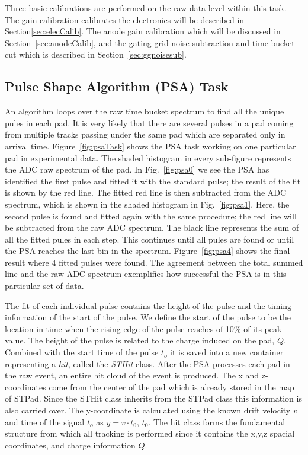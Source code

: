 Three basic calibrations are performed on the raw data level within this task. The gain calibration calibrates the electronics will be described in Section\ref{sec:elecCalib}. The anode gain calibration which will be discussed in Section~\ref{sec:anodeCalib}, and the gating grid noise subtraction and time bucket cut which is described in Section~\ref{sec:ggnoisesub}.


\subsection{Pulse Shape Algorithm (PSA) Task}
\label{sec:psa}
An algorithm loops over the raw time bucket spectrum to find all the unique pules in each pad. It is very likely that there are several pulses in a pad coming from multiple tracks passing under the same pad which are separated only in arrival time. Figure~\ref{fig:psaTask} shows the PSA task working on one particular pad in experimental data. The shaded histogram in every sub-figure represents the ADC raw spectrum of the pad. In Fig.~\ref{fig:psa0} we see the PSA has identified the first pulse and fitted it with the standard pulse; the result of the fit is shown by the red line. The fitted red line is then subtracted from the ADC spectrum, which is shown in the shaded histogram in Fig.~\ref{fig:psa1}. Here, the second pulse is found and fitted again with the same procedure; the red line will be subtracted from the raw ADC spectrum. The black line represents the sum of all the fitted pules in each step. This continues until all pules are found or until the PSA reaches the last bin in the spectrum. Figure~\ref{fig:psa4} shows the final result where 4 fitted pulses were found. The agreement between the total summed line and the raw ADC spectrum exemplifies how successful the PSA is in this particular set of data. 


The fit of each individual pulse contains the height of the pulse and the timing information of the start of the pulse. We define the start of the pulse to be the location in time when the rising edge of the pulse reaches of 10\% of its peak value. The height of the pulse is related to the charge induced on the pad, $Q$. Combined with the start time of the pulse $t_o$  it is saved into a new container representing a \emph{hit}, called the \emph{STHit} class. After the PSA processes each pad in the raw event, an entire hit cloud of the event is produced. The x and z-coordinates come from the center of the pad which is already stored in the map of STPad. Since the STHit class inherits from the STPad class this information is also carried over. The y-coordinate is calculated using the known drift velocity $v$ and time of the signal $t_o$ as $y = v\cdot t_0$, $t_0$. The hit class forms the fundamental structure from which all tracking is performed since it contains the x,y,z spacial coordinates, and charge information $Q$.



